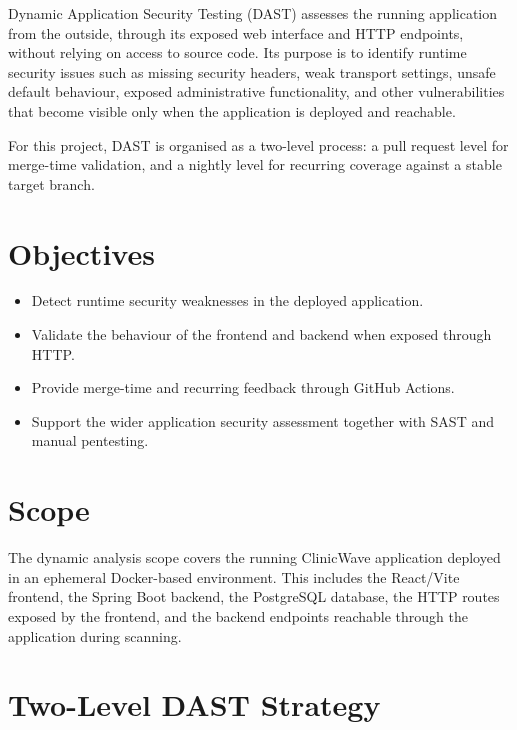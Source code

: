 \documentclass[12pt,a4paper]{report}
\begin{document}
Dynamic Application Security Testing (DAST) assesses the running application from the outside, through its exposed web interface and HTTP endpoints, without relying on access to source code. Its purpose is to identify runtime security issues such as missing security headers, weak transport settings, unsafe default behaviour, exposed administrative functionality, and other vulnerabilities that become visible only when the application is deployed and reachable.

For this project, DAST is organised as a two-level process: a pull request level for merge-time validation, and a nightly level for recurring coverage against a stable target branch.

\section{Objectives}

\begin{itemize}
  \item Detect runtime security weaknesses in the deployed application.
  \item Validate the behaviour of the frontend and backend when exposed through HTTP.
  \item Provide merge-time and recurring feedback through GitHub Actions.
  \item Support the wider application security assessment together with SAST and manual pentesting.
\end{itemize}

\section{Scope}

The dynamic analysis scope covers the running ClinicWave application deployed in an ephemeral Docker-based environment. This includes the React/Vite frontend, the Spring Boot backend, the PostgreSQL database, the HTTP routes exposed by the frontend, and the backend endpoints reachable through the application during scanning.

\section{Two-Level DAST Strategy}
\end{document}
